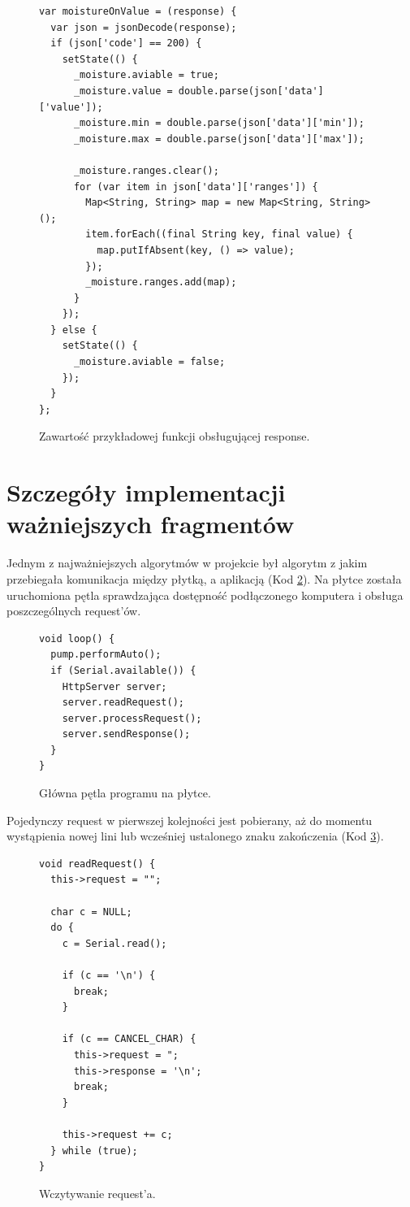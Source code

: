 \documentclass[a4paper,twoside,12pt]{book}
\begin{document}
\begin{figure}[H]
   \centering
   \footnotesize
   \begin{lstlisting}
var moistureOnValue = (response) {
  var json = jsonDecode(response);
  if (json['code'] == 200) {
    setState(() {
      _moisture.aviable = true;
      _moisture.value = double.parse(json['data']['value']);
      _moisture.min = double.parse(json['data']['min']);
      _moisture.max = double.parse(json['data']['max']);

      _moisture.ranges.clear();
      for (var item in json['data']['ranges']) {
        Map<String, String> map = new Map<String, String>();
        item.forEach((final String key, final value) {
          map.putIfAbsent(key, () => value);
        });
        _moisture.ranges.add(map);
      }
    });
  } else {
    setState(() {
      _moisture.aviable = false;
    });
  }
};
   \end{lstlisting}
   \caption{Zawartość przykładowej funkcji obsługującej response.}
   \label{code:11}
\end{figure}

\newpage

\section{Szczegóły implementacji ważniejszych fragmentów}

Jednym z najważniejszych algorytmów w projekcie był algorytm z jakim przebiegała komunikacja między płytką, a aplikacją (Kod \ref{code:12}). Na płytce została uruchomiona pętla sprawdzająca dostępność podłączonego komputera i obsługa poszczególnych request'ów.

\begin{figure}[H]
   \centering
   \footnotesize
   \begin{lstlisting}
void loop() {
  pump.performAuto();
  if (Serial.available()) {
    HttpServer server;
    server.readRequest();
    server.processRequest();
    server.sendResponse();
  }
}
   \end{lstlisting}
   \caption{Główna pętla programu na płytce.}
   \label{code:12}
\end{figure}

\newpage

Pojedynczy request w pierwszej kolejności jest pobierany, aż do momentu wystąpienia nowej lini lub wcześniej ustalonego znaku zakończenia (Kod \ref{code:13}).

\begin{figure}[H]
   \centering
   \footnotesize
   \begin{lstlisting}
void readRequest() {
  this->request = "";

  char c = NULL;
  do {
    c = Serial.read();

    if (c == '\n') {
      break;
    }

    if (c == CANCEL_CHAR) {
      this->request = ";
      this->response = '\n';
      break;
    }

    this->request += c;
  } while (true);
}
   \end{lstlisting}
   \caption{Wczytywanie request'a.}
   \label{code:13}
\end{figure}
\end{document}
